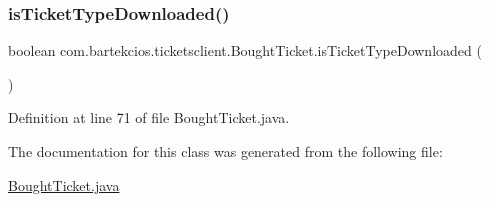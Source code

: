\subsubsection{\texorpdfstring{is\+Ticket\+Type\+Downloaded()}{isTicketTypeDownloaded()}}
{\footnotesize\ttfamily boolean com.\+bartekcios.\+ticketsclient.\+Bought\+Ticket.\+is\+Ticket\+Type\+Downloaded (\begin{DoxyParamCaption}{ }\end{DoxyParamCaption})}



Definition at line 71 of file Bought\+Ticket.\+java.



The documentation for this class was generated from the following file\+:\begin{DoxyCompactItemize}
\item 
\hyperlink{_bought_ticket_8java}{Bought\+Ticket.\+java}\end{DoxyCompactItemize}

